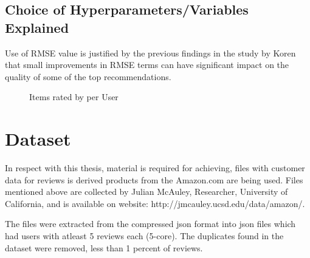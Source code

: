 \subsection{Choice of Hyperparameters/Variables Explained}

Use of RMSE value is justified by the previous findings in the study by Koren \cite{Koren2010} \cite{Koren2008} that small improvements in RMSE terms can have significant impact on the quality of some of the top recommendations.


\begin{figure}[H]
  {\par}
  \caption{Items rated by per User}\label{Items rated by per User}
\end{figure}

\section{Dataset}
In respect with this thesis, material is required for achieving, files with customer data for reviews is derived products from the Amazon.com are being used. Files mentioned above are collected by Julian McAuley, Researcher, University of California, and is available on website: http://jmcauley.ucsd.edu/data/amazon/.

The files were extracted from the compressed json format into json files which had users with atleast 5 reviews each (5-core). The duplicates found in the dataset were removed, less than 1 percent of reviews.

